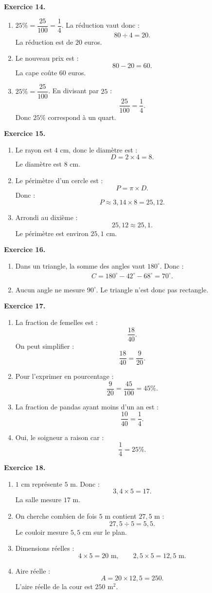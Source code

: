 \documentclass[11pt,a4paper]{article}
\newcommand{\corrige}[2]{
\begin{corrigebox}
\textbf{Exercice #1.}

#2
\end{corrigebox}
}
\begin{document}
\corrige{14}{
\begin{enumerate}[label=\arabic*)]
\item $25\%=\dfrac{25}{100}=\dfrac{1}{4}$.
La réduction vaut donc :
\[
80\div 4=20.
\]
La réduction est de $20$ euros.
\item Le nouveau prix est :
\[
80-20=60.
\]
La cape coûte $60$ euros.
\item $25\%=\dfrac{25}{100}$. En divisant par $25$ :
\[
\frac{25}{100}=\frac{1}{4}.
\]
Donc $25\%$ correspond à un quart.
\end{enumerate}
}

\corrige{15}{
\begin{enumerate}[label=\arabic*)]
\item Le rayon est $4$ cm, donc le diamètre est :
\[
D=2\times 4=8.
\]
Le diamètre est $8$ cm.
\item Le périmètre d'un cercle est :
\[
P=\pi\times D.
\]
Donc :
\[
P\approx 3,14\times 8=25,12.
\]
\item Arrondi au dixième :
\[
25,12\approx 25,1.
\]
Le périmètre est environ $25,1$ cm.
\end{enumerate}
}

\corrige{16}{
\begin{enumerate}[label=\arabic*)]
\item Dans un triangle, la somme des angles vaut $180^\circ$.
Donc :
\[
\widehat{C}=180^\circ-42^\circ-68^\circ=70^\circ.
\]
\item Aucun angle ne mesure $90^\circ$.
Le triangle n'est donc pas rectangle.
\end{enumerate}
}

\corrige{17}{
\begin{enumerate}[label=\arabic*)]
\item La fraction de femelles est :
\[
\frac{18}{40}.
\]
On peut simplifier :
\[
\frac{18}{40}=\frac{9}{20}.
\]
\item Pour l'exprimer en pourcentage :
\[
\frac{9}{20}=\frac{45}{100}=45\%.
\]
\item La fraction de pandas ayant moins d'un an est :
\[
\frac{10}{40}=\frac{1}{4}.
\]
\item Oui, le soigneur a raison car :
\[
\frac{1}{4}=25\%.
\]
\end{enumerate}
}

\corrige{18}{
\begin{enumerate}[label=\arabic*)]
\item $1$ cm représente $5$ m.
Donc :
\[
3,4\times 5=17.
\]
La salle mesure $17$ m.
\item On cherche combien de fois $5$ m contient $27,5$ m :
\[
27,5\div 5=5,5.
\]
Le couloir mesure $5,5$ cm sur le plan.
\item Dimensions réelles :
\[
4\times 5=20\text{ m},
\qquad
2,5\times 5=12,5\text{ m}.
\]
\item Aire réelle :
\[
A=20\times 12,5=250.
\]
L'aire réelle de la cour est $250$ m$^2$.
\end{enumerate}
}
\end{document}
